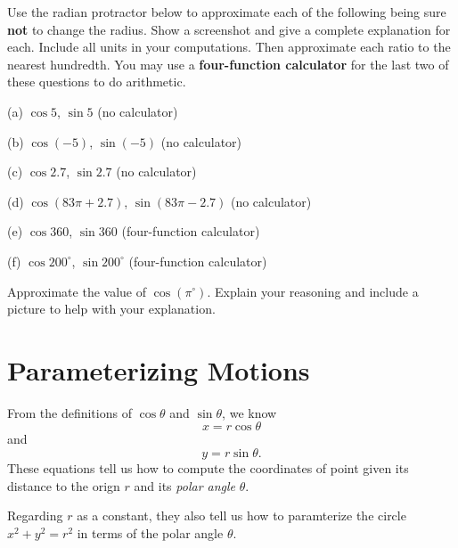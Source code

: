 \documentclass{ximera}
\begin{document}
\begin{exploration}\label{Exp1:CF}
Use the radian protractor below to approximate each of the following being sure {\bf not} to change the radius. Show a screenshot and give a complete explanation for each. Include all units in your computations. Then approximate each ratio to the nearest hundredth. You may use a {\bf four-function calculator} for the last two of these questions to do arithmetic.

(a) $\cos 5$, $\sin 5$  (no calculator)

(b) $\cos (-5)$,  $\sin (-5)$ (no calculator)

(c) $\cos 2.7$, $\sin 2.7$ (no calculator)

(d) $\cos (83\pi + 2.7)$, $\sin (83\pi-2.7)$ (no calculator)

(e) $\cos 360$, $\sin 360$ (four-function calculator)

(f) $\cos 200^\circ$, $\sin 200^\circ$ (four-function calculator)

 
\begin{onlineOnly}
    \begin{center}
\end{center}
\end{onlineOnly}
\end{exploration}

\begin{question} \label{Q2:Cosine}
Approximate the value of $\cos (\pi^\circ)$. Explain your reasoning and include a picture to help with your explanation.
\end{question}


\section{Parameterizing Motions}
From the definitions of $\cos\theta$ and $\sin \theta$, we know
\[
    x = r \cos \theta 
\]
and
\[
      y=r\sin \theta .
\]
These equations tell us how to compute the coordinates of point given its distance to the orign $r$ and its \emph{polar angle} $\theta$.

Regarding $r$ as a constant, they also tell us how to paramterize the circle $x^2 + y^2 = r^2$ in terms of the polar angle $\theta$.
\end{document}
